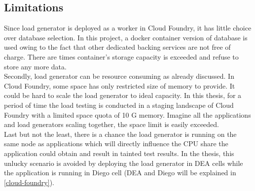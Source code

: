 \subsection{Limitations}
Since load generator is deployed as a worker in Cloud Foundry, it has little choice over database selection. In this project, a docker container version of database is used owing to the fact that other dedicated backing services are not free of charge. There are times container's storage capacity is exceeded and refuse to store any more data. \\
Secondly, load generator can be resource consuming as already discussed. In Cloud Foundry, some space has only restricted size of memory to provide. It could be hard to scale the load generator to ideal capacity. In this thesis, for a period of time the load testing is conducted in a staging landscape of Cloud Foundry with a limited space quota of 10 G memory. Imagine all the applications and load generators scaling together, the space limit is easily exceeded. \\
Last but not the least, there is a chance the load generator is running on the same node as applications which will directly influence the CPU share the application could obtain and result in tainted test results. In the thesis, this unlucky scenario is avoided by deploying the load generator in DEA cells while the application is running in Diego cell (DEA and Diego will be explained in \ref{cloud-foundry}).

